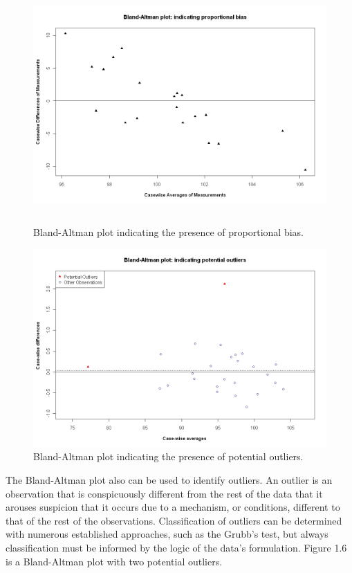 \documentclass[Main.tex]{subfiles}
\begin{document}
	\begin{figure}[h!]
		\begin{center}
			\includegraphics[height=90mm]{images/PropBias.jpeg}
			\caption{Bland-Altman plot indicating the presence of proportional bias.}\label{PropBias}
		\end{center}
	\end{figure}
	
	\begin{figure}[h!]
		\begin{center}
			\includegraphics[width=125mm]{images/BAOutliers.jpeg}
			\caption{Bland-Altman plot indicating the presence of potential outliers.}\label{Outliers}
		\end{center}
	\end{figure}
	
	
	
	
	The Bland-Altman plot also can be used to identify outliers. An
	outlier is an observation that is conspicuously different from the
	rest of the data that it arouses suspicion that it occurs due to a
	mechanism, or conditions, different to that of the rest of the
	observations. Classification of outliers can be determined with
	numerous established approaches, such as the Grubb's test, but
	always classification must be informed by the logic of the data's
	formulation. Figure 1.6 is a Bland-Altman plot with two potential
	outliers.
	
\end{document}
